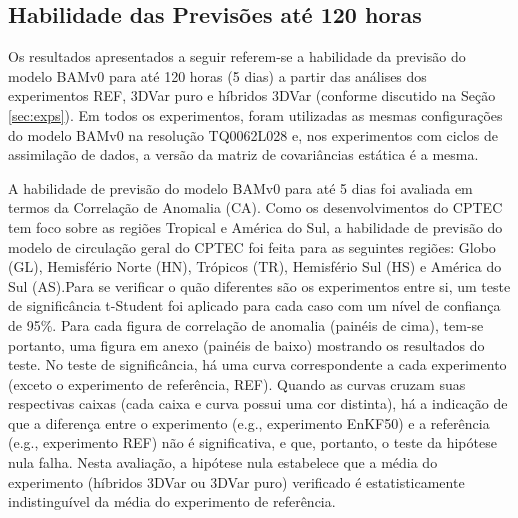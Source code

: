 \begin{figure}[H]
\begin{center}
{        }        
    \end{center}
    \vspace{2mm}
  \label{fig:innov_ens_00z_ic}
\end{figure}

\subsection{Habilidade das Previsões até 120 horas}
\label{sec:exps_obs_completo}

Os resultados apresentados a seguir referem-se a habilidade da previsão do modelo BAMv0 para até 120 horas (5 dias) a partir das análises dos experimentos REF, 3DVar puro e híbridos 3DVar (conforme discutido na Seção \ref{sec:exps}). Em todos os experimentos, foram utilizadas as mesmas configurações do modelo BAMv0 na resolução TQ0062L028 e, nos experimentos com ciclos de assimilação de dados, a versão da matriz de covariâncias estática é a mesma. 

A habilidade de previsão do modelo BAMv0 para até 5 dias foi avaliada em termos da Correlação de Anomalia (CA). Como os desenvolvimentos do CPTEC tem foco sobre as regiões Tropical e América do Sul, a habilidade de previsão do modelo de circulação geral do CPTEC foi feita para as seguintes regiões: Globo (GL), Hemisfério Norte (HN), Trópicos (TR), Hemisfério Sul (HS) e América do Sul (AS).Para se verificar o quão diferentes são os experimentos entre si, um teste de significância t-Student foi aplicado para cada caso com um nível de confiança de 95\%. Para cada figura de correlação de anomalia (painéis de cima), tem-se portanto, uma figura em anexo (painéis de baixo) mostrando os resultados do teste. No teste de significância, há uma curva correspondente a cada experimento (exceto o experimento de referência, REF). Quando as curvas cruzam suas respectivas caixas (cada caixa e curva possui uma cor distinta), há a indicação de que a diferença entre o experimento (e.g., experimento EnKF50) e a referência (e.g., experimento REF) não é significativa, e que, portanto, o teste da hipótese nula falha. Nesta avaliação, a hipótese nula estabelece que a média do experimento (híbridos 3DVar ou 3DVar puro) verificado é estatisticamente indistinguível da média do experimento de referência.


